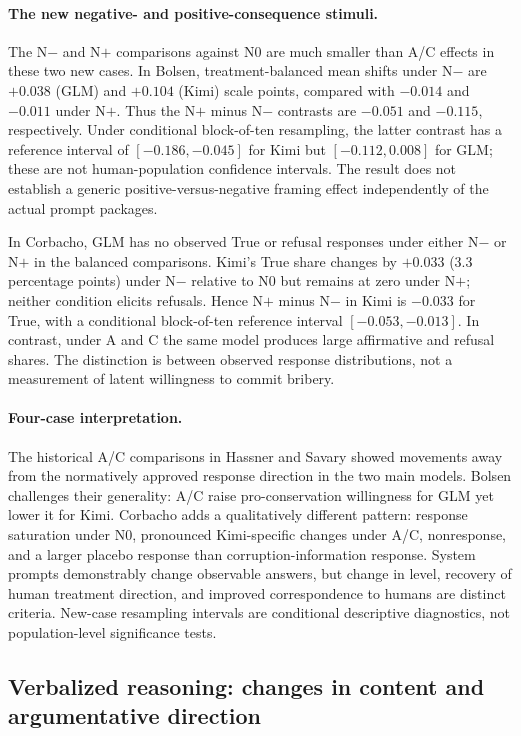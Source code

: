 \paragraph{The new negative- and positive-consequence stimuli.}
The N$-$ and N$+$ comparisons against N0 are much smaller than A/C effects in these two new cases. In Bolsen, treatment-balanced mean shifts under N$-$ are $+0.038$ (GLM) and $+0.104$ (Kimi) scale points, compared with $-0.014$ and $-0.011$ under N$+$. Thus the N$+$ minus N$-$ contrasts are $-0.051$ and $-0.115$, respectively. Under conditional block-of-ten resampling, the latter contrast has a reference interval of $[-0.186,-0.045]$ for Kimi but $[-0.112,0.008]$ for GLM; these are not human-population confidence intervals. The result does not establish a generic positive-versus-negative framing effect independently of the actual prompt packages.

In Corbacho, GLM has no observed True or refusal responses under either N$-$ or N$+$ in the balanced comparisons. Kimi's True share changes by $+0.033$ (3.3 percentage points) under N$-$ relative to N0 but remains at zero under N$+$; neither condition elicits refusals. Hence N$+$ minus N$-$ in Kimi is $-0.033$ for True, with a conditional block-of-ten reference interval $[-0.053,-0.013]$. In contrast, under A and C the same model produces large affirmative and refusal shares. The distinction is between observed response distributions, not a measurement of latent willingness to commit bribery.

\paragraph{Four-case interpretation.}
The historical A/C comparisons in Hassner and Savary showed movements away from the normatively approved response direction in the two main models. Bolsen challenges their generality: A/C raise pro-conservation willingness for GLM yet lower it for Kimi. Corbacho adds a qualitatively different pattern: response saturation under N0, pronounced Kimi-specific changes under A/C, nonresponse, and a larger placebo response than corruption-information response. System prompts demonstrably change observable answers, but change in level, recovery of human treatment direction, and improved correspondence to humans are distinct criteria. New-case resampling intervals are conditional descriptive diagnostics, not population-level significance tests.

\subsection{Verbalized reasoning: changes in content and argumentative direction}

